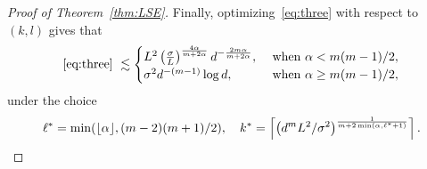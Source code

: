 \documentclass[12pt]{article}
\theoremstyle{definition}
\begin{document}
\begin{proof}[Proof of Theorem~\ref{thm:LSE}]
Finally, optimizing~\eqref{eq:three} with respect to $(k,l)$ gives that 
\begin{align}
     \eqref{eq:three}\ \lesssim 
     \begin{cases} 
    L^2\left({\sigma\over L}\right)^{4\alpha\over m+2\alpha} d^{-\frac{2m\alpha}{m+2\alpha}}, & \text{ when } \alpha < m(m-1)/2,\\
     \sigma^2 d^{-(m-1)}\log d, &\text{ when } \alpha \geq m(m-1)/2,
    \end{cases}
\end{align}
under the choice
\[
\ell^* = \min(\lfloor \alpha\rfloor,(m-2)(m+1)/2),\quad k^* = \left\lceil \left( d^m L^2 /\sigma^2\right)^{1\over m+2\min(\alpha,\ell^*+1)} \right\rceil.
\]

\end{proof}
\end{document}
